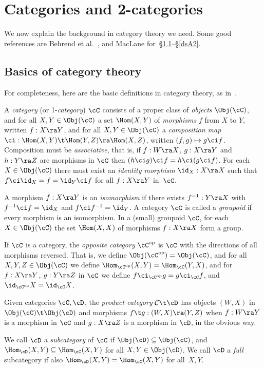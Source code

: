 \documentclass{article}
\begin{document}
\appendix

\section{Categories and 2-categories}
\label{dsA}

We now explain the background in category theory we need. Some good
references are Behrend et al.\ \cite[App.~B]{BEFF}, and MacLane
\cite{MacL} for~\S\ref{dsA1}--\S\ref{dsA2}.

\subsection{Basics of category theory}
\label{dsA1}

For completeness, here are the basic definitions in category theory,
as in~\cite[\S I]{MacL}.

\begin{dfn} A {\it category\/} (or 1-{\it category\/}) $\cC$
consists of a proper class of {\it objects\/} $\Obj(\cC)$, and for
all $X,Y\in\Obj(\cC)$ a set $\Hom(X,Y)$ of {\it
morphisms\/} $f$ from $X$ to $Y$, written
$f:X\ra Y$, and for all $X,Y\in\Obj(\cC)$ a {\it composition map\/}
$\ci:\Hom(X,Y)\t\Hom(Y,Z)\ra\Hom(X,Z)$, written $(f,g)\mapsto g\ci
f$. Composition must be {\it associative}, that is, if $f:W\ra X$,
$g:X\ra Y$ and $h:Y\ra Z$ are morphisms in $\cC$ then $(h\ci g)\ci
f=h\ci(g\ci f)$. For each $X\in \Obj(\cC)$ there must exist an {\it
identity morphism\/} $\id_X:X\ra X$ such that $f\ci\id_X=f=\id_Y\ci
f$ for all $f:X\ra Y$ in~$\cC$.

A morphism $f:X\ra Y$ is an {\it isomorphism\/} if there exists
$f^{-1}:Y\ra X$ with $f^{-1}\ci f=\id_X$ and $f\ci f^{-1}=\id_Y$. A
category $\cC$ is called a {\it
groupoid\/} if every morphism is an
isomorphism. In a (small) groupoid $\cC$, for each $X\in\Obj(\cC)$
the set $\Hom(X,X)$ of morphisms $f:X\ra X$ form a group.

If $\cC$ is a category, the {\it opposite
category\/} ${\cC}^{\rm op}$ is $\cC$ with the
directions of all morphisms reversed. That is, we define
$\Obj(\cC^{\rm op})=\Obj(\cC)$, and for all $X,Y,Z\in\Obj(\cC)$ we
define $\Hom_{\cC^{\rm op}}(X,Y)=\Hom_\cC(Y,X)$, and for $f:X\ra Y$,
$g:Y\ra Z$ in $\cC$ we define $f\ci_{\cC^{\rm op}}g=g\ci_\cC f$, and
$\id_{\cC^{\rm op}}X=\id_\cC X$.

Given categories $\cC,\cD$, the {\it product category\/} ${\cal
C}\t\cD$ has objects $(W,X)$ in $\Obj(\cC)\t\Obj(\cD)$ and morphisms
$f\t g:(W,X)\ra (Y,Z)$ when $f:W\ra Y$ is a morphism in $\cC$ and
$g:X\ra Z$ is a morphism in $\cD$, in the obvious way.

We call $\cD$ a {\it subcategory\/} of $\cC$
if $\Obj(\cD)\subseteq \Obj(\cC)$, and
$\Hom_\cD(X,Y)\subseteq\Hom_\cC(X,Y)$ for all $X,Y\in\Obj(\cD)$. We
call $\cD$ a {\it full\/} subcategory
if also $\Hom_\cD(X,Y)=\Hom_\cC(X,Y)$ for all~$X,Y$.
\label{dsAdef1}
\end{dfn}
\end{document}
